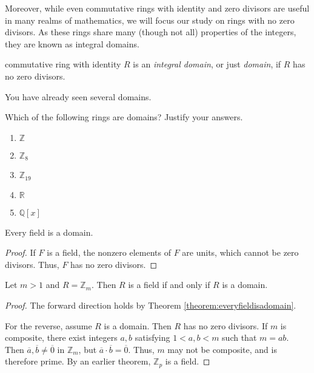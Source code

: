 \documentclass[english,course]{lecture}
\theoremstyle{plain}
\newenvironment{definition}[1]
  {\renewcommand\theinnerdefinition{#1}\innerdefinition}
  {\endinnerdefinition}
\def\Z{{\mathbb Z}}
\def\Q{{\mathbb Q}}
\def\R{{\mathbb R}}
\def\presnotes{}
\begin{document}
Moreover, while even commutative rings with identity and zero divisors are useful in many realms of mathematics, we will focus our study on rings with no zero divisors.
As these rings share many (though not all) properties of the integers, they are known as integral domains.


\begin{definition}
	A commutative ring with identity $R$ is an \emph{integral domain}, or just \emph{domain}, if $R$ has no zero divisors.
\end{definition}

You have already seen several domains.

\begin{exer}
	Which of the following rings are domains? Justify your answers.
	\begin{enumerate}
		\item $\Z$
		\item $\Z_{8}$
		\item $\Z_{19}$
		\item $\R$
		\item $\Q[x]$
	\end{enumerate}
\end{exer}

\presnotes


\begin{theorem}\label{theorem:everyfieldisadomain}
	Every field is a domain.
\end{theorem}

\begin{proof}
	If $F$ is a field, the nonzero elements of $F$ are units, which cannot be zero divisors.
	Thus, $F$ has no zero divisors.
\end{proof}

\presnotes

\begin{theorem}
	Let $m > 1$ and $R = \Z_m$.
	Then $R$ is a field if and only if $R$ is a domain.
\end{theorem}

\begin{proof}
	The forward direction holds by Theorem \ref{theorem:everyfieldisadomain}.
	
	For the reverse, assume $R$ is a domain.
	Then $R$ has no zero divisors.
	If $m$ is composite, there exist integers $a,b$ satisfying $1 < a,b < m$ such that $m=ab$.
	Then $\overline{a},\overline{b}\ne \overline{0}$ in $\Z_m$, but $\overline{a}\cdot \overline{b} = \overline{0}$.
	Thus, $m$ may not be composite, and is therefore prime.
	By an earlier theorem, $\Z_p$ is a field.
\end{proof}
\end{document}
